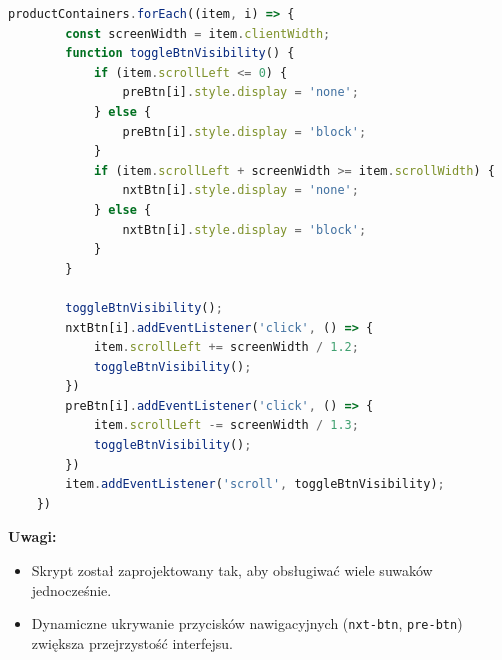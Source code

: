 \documentclass[12pt,a4paper,oneside]{article}
\theoremstyle{definition}
\numberwithin{equation}{section}
\begin{document}
\begin{itemize}
\begin{lstlisting}[language=JavaScript, caption=Skrypt home\_page.js]
    productContainers.forEach((item, i) => {
        const screenWidth = item.clientWidth;
        function toggleBtnVisibility() {
            if (item.scrollLeft <= 0) {
                preBtn[i].style.display = 'none';
            } else {
                preBtn[i].style.display = 'block';
            }
            if (item.scrollLeft + screenWidth >= item.scrollWidth) {
                nxtBtn[i].style.display = 'none';
            } else {
                nxtBtn[i].style.display = 'block';
            }
        }

        toggleBtnVisibility();
        nxtBtn[i].addEventListener('click', () => {
            item.scrollLeft += screenWidth / 1.2;
            toggleBtnVisibility();
        })
        preBtn[i].addEventListener('click', () => {
            item.scrollLeft -= screenWidth / 1.3;
            toggleBtnVisibility();
        })
        item.addEventListener('scroll', toggleBtnVisibility);
    })
        \end{lstlisting}
        \textbf{Uwagi:}
        \begin{itemize}
            \item Skrypt został zaprojektowany tak, aby obsługiwać wiele suwaków jednocześnie.
            \item Dynamiczne ukrywanie przycisków nawigacyjnych (\texttt{nxt-btn}, \texttt{pre-btn}) zwiększa przejrzystość interfejsu.
        \end{itemize}
\end{itemize}
\end{document}
